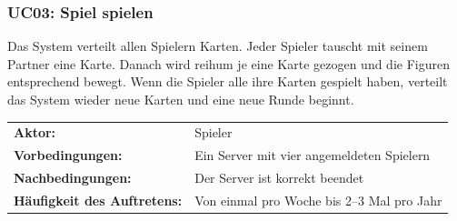 \documentclass[12pt,halfparskip]{scrartcl}
\begin{document}
\subsubsection{UC03: Spiel spielen}\label{ssub:uc03_spiel_erstellen}
Das System verteilt allen Spielern Karten. Jeder Spieler tauscht mit seinem Partner eine Karte. Danach wird reihum je eine Karte gezogen und die Figuren entsprechend bewegt. Wenn die Spieler alle ihre Karten gespielt haben, verteilt das System wieder neue Karten und eine neue Runde beginnt. 

\begin{tabular}{@{} l l @{}}
	\textbf{Aktor:}														&	Spieler \\
	\textbf{Vorbedingungen:}									& Ein Server mit vier angemeldeten Spielern \\
	\textbf{Nachbedingungen:}									& Der Server ist korrekt beendet \\
	\textbf{Häufigkeit des Auftretens:}				& Von einmal pro Woche bis 2--3 Mal pro Jahr \\
\end{tabular}
\newpage
\end{document}
